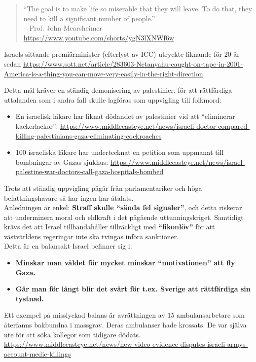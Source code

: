 \begin{quote}
“The goal is to make life so miserable that they will leave. To do that, they need to kill a significant number of people.”\\
\hfill – Prof. John Mearsheimer \url{https://www.youtube.com/shorts/ygN3lXNWf6w}
\end{quote}

\noindent
Israels sittande premiärminister (efterlyst av ICC) utryckte liknande för 20 år sedan
\url{https://www.sott.net/article/283603-Netanyahu-caught-on-tape-in-2001-America-is-a-thing-you-can-move-very-easily-in-the-right-direction}

\noindent
Detta mål kräver en ständig demonisering av palestinier, för att rättfärdiga uttalanden som i andra fall skulle lagföras som uppvigling till folkmord:

\begin{itemize}
  \item En israelisk läkare har liknat dödandet av palestinier vid att “eliminerar kackerlackor”: \url{https://www.middleeasteye.net/news/israeli-doctor-compared-killing-palestinians-gaza-eliminating-cockroaches}
  \item 100 israeliska läkare har undertecknat en petition som uppmanat till bombningar av Gazas sjukhus: \url{https://www.middleeasteye.net/news/israel-palestine-war-doctors-call-gaza-hospitals-bombed}
\end{itemize}

\noindent
Trots att ständig uppvigling pågår från parlamentariker och höga befattningshavare så har ingen har åtalats.\\

Anledningen är enkel: \textbf{Straff skulle \enquote{sända fel signaler}}, och detta riskerar att underminera moral och eldkraft i det pågående uttunningskriget. Samtidigt krävs det att Israel tillhandahåller tillräckligt med \textbf{\enquote{fikonlöv}} för att västvärldens regeringar inte ska tvingas införa sanktioner.\\

Detta är en balansakt Israel befinner sig i:
\begin{itemize}
\item \textbf{Minskar man våldet för mycket minskar \enquote{motivationen} att fly Gaza.}
\item \textbf{Går man för långt blir det svårt för t.ex. Sverige att rättfärdiga sin tystnad.}
\end{itemize}

\noindent
Ett exempel på misslyckad balans är avrättningen av 15 ambulansarbetare som återfanns bakbundna i massgrav. Deras ambulanser hade krossats. De var själva ute för att söka kollegor som tidigare dödats.\\
\url{https://www.middleeasteye.net/news/new-video-evidence-disputes-israeli-armys-account-medic-killings}\\


